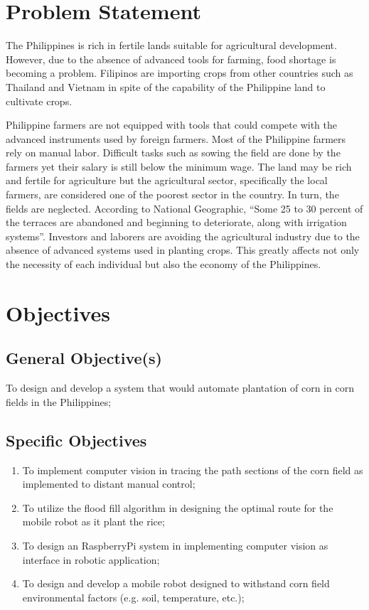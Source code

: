 \section{Problem Statement}
The Philippines is rich in fertile lands suitable for agricultural development. However, due to the absence of advanced tools for farming, food shortage is becoming a problem. Filipinos are importing crops from other countries such as Thailand and Vietnam in spite of the capability of the Philippine land to cultivate crops.
 
Philippine farmers are not equipped with tools that could compete with the advanced instruments used by foreign farmers. Most of the Philippine farmers rely on manual labor. Difficult tasks such as sowing the field are done by the farmers yet their salary is still below the minimum wage. The land may be rich and fertile for agriculture but the agricultural sector, specifically the local farmers, are considered one of the poorest sector in the country. In turn, the fields are neglected. According to National Geographic, “Some 25 to 30 percent of the terraces are abandoned and beginning to deteriorate, along with irrigation systems”. Investors and laborers are avoiding the agricultural industry due to the absence of advanced systems used in planting crops. This greatly affects not only the necessity of each individual but also the economy of the Philippines.
 
\section{Objectives}
\subsection{General Objective(s)}
To design and develop a system that would automate plantation of corn in corn fields in the Philippines;
 
\subsection{Specific Objectives}
 
\begin{enumerate}
\item To implement computer vision in tracing the path sections of the corn field as implemented to distant manual control;
 
\item To utilize the flood fill algorithm in designing the optimal route for the mobile robot as it plant the rice;
 
\item To design an RaspberryPi system in implementing computer vision as interface in robotic application;
 
\item To design and develop a mobile robot designed to withstand corn field environmental factors (e.g. soil, temperature, etc.);
 
\end{enumerate}
 
